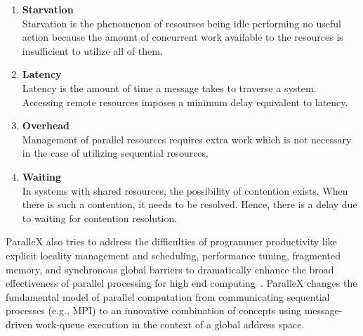 \begin{enumerate}
\item \textbf{Starvation}\\
  Starvation is the phenomenon of resourses being idle performing no useful action because the amount of concurrent work available to the resources is insufficient to utilize all of them.
\item \textbf{Latency}\\
  Latency is the amount of time a message takes to traverse a system. Accessing remote resources imposes a minimum delay equivalent to latency.
\item \textbf{Overhead}\\
  Management of parallel resources requires extra work which is not necessary in the case of utilizing sequential resources.
\item \textbf{Waiting}\\
  In systems with shared resources, the possibility of contention exists. When there is such a contention, it needs to be resolved. Hence, there is a delay due to waiting for contention resolution.
\end{enumerate}

ParalleX also tries to address the difficulties of programmer productivity like explicit locality management and scheduling, performance tuning, fragmented memory, and synchronous global barriers to dramatically enhance the broad effectiveness of parallel processing for high end computing~\cite{4228212}. ParalleX changes the fundamental model of parallel computation from communicating sequential processes (e.g., MPI) to an innovative combination of concepts using message-driven work-queue execution in the context of a global address space.~\cite{tabbal2011preliminary,sterling2014towards}

